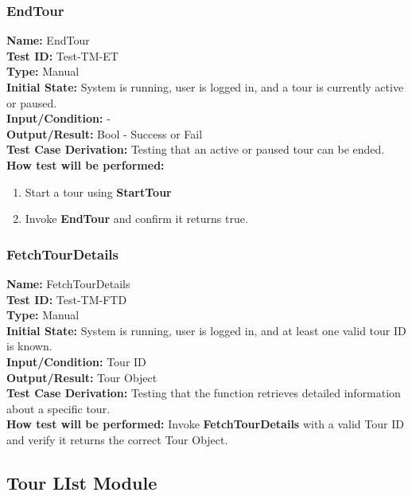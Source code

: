 \documentclass[12pt, titlepage]{article}
\begin{document}
\subsubsection{EndTour}
\textbf{Name:} EndTour \label{itm:Test-TM-ET} \\
\textbf{Test ID:} Test-TM-ET \\
\textbf{Type:} Manual \\
\textbf{Initial State:} System is running, user is logged in, and a tour is currently active or paused. \\
\textbf{Input/Condition:} - \\
\textbf{Output/Result:} Bool - Success or Fail \\
\textbf{Test Case Derivation:} Testing that an active or paused tour can be ended. \\
\textbf{How test will be performed:}
\begin{enumerate}
    \item Start a tour using \textbf{StartTour}
    \item Invoke \textbf{EndTour} and confirm it returns true.
\end{enumerate}

\subsubsection{FetchTourDetails}
\textbf{Name:} FetchTourDetails \label{itm:Test-TM-FTD} \\
\textbf{Test ID:} Test-TM-FTD \\
\textbf{Type:} Manual \\
\textbf{Initial State:} System is running, user is logged in, and at least one valid tour ID is known. \\
\textbf{Input/Condition:} Tour ID \\
\textbf{Output/Result:} Tour Object \\
\textbf{Test Case Derivation:} Testing that the function retrieves detailed information about a specific tour. \\
\textbf{How test will be performed:} Invoke \textbf{FetchTourDetails} with a valid Tour ID and verify it returns the correct Tour Object.

 \subsection{Tour LIst Module}
\end{document}
